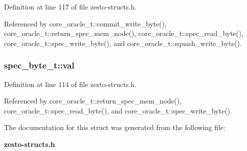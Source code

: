 Definition at line 117 of file zesto-structs.h.

Referenced by core\_\-oracle\_\-t::commit\_\-write\_\-byte(), core\_\-oracle\_\-t::return\_\-spec\_\-mem\_\-node(), core\_\-oracle\_\-t::spec\_\-read\_\-byte(), core\_\-oracle\_\-t::spec\_\-write\_\-byte(), and core\_\-oracle\_\-t::squash\_\-write\_\-byte().
\subsubsection[{val}]{ {\bf spec\_\-byte\_\-t::val}}\label{structspec__byte__t_529d3138d7fe5292c57c89dea4c355f7}




Definition at line 114 of file zesto-structs.h.

Referenced by core\_\-oracle\_\-t::return\_\-spec\_\-mem\_\-node(), core\_\-oracle\_\-t::spec\_\-read\_\-byte(), and core\_\-oracle\_\-t::spec\_\-write\_\-byte().

The documentation for this struct was generated from the following file:\begin{CompactItemize}
\item 
{\bf zesto-structs.h}\end{CompactItemize}
